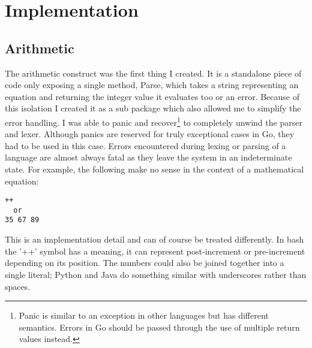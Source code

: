 \chapter{Implementation}




\section{Arithmetic}
The arithmetic construct was the first thing I created.
It is a standalone piece of code only exposing a single method, Parse, which takes a string representing an equation and returning the integer value it evaluates too or an error.
Because of this isolation I created it as a sub package which also allowed me to simplify the error handling.
I was able to panic and recover\footnote{Panic is similar to an exception in other languages but has different semantics. Errors in Go should be passed through the use of multiple return values instead.} to completely unwind the parser and lexer.
Although panics are reserved for truly exceptional cases in Go, they had to be used in this case.
Errors encountered during lexing or parsing of a language are almost always fatal as they leave the system in an indeterminate state.
For example, the following make no sense in the context of a mathematical equation:
\begin{verbatim}
++
  or
35 67 89
\end{verbatim}
This is an implementation detail and can of course be treated differently.
In bash the '++' symbol has a meaning, it can represent post-increment or pre-increment depending on its position.
The numbers could also be joined together into a single literal; Python and Java do something similar with underscores rather than spaces\cite{UNDERSCORE-NUM-LITERAL}.

